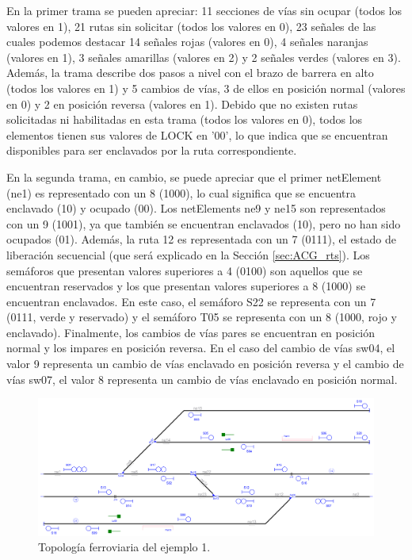 	En la primer trama se pueden apreciar: 11 secciones de vías sin ocupar (todos los valores en 1), 21 rutas sin solicitar (todos los valores en 0), 23 señales de las cuales podemos destacar 14 señales rojas (valores en 0), 4 señales naranjas (valores en 1), 3 señales amarillas (valores en 2) y 2 señales verdes (valores en 3). Además, la trama describe dos pasos a nivel con el brazo de barrera en alto (todos los valores en 1) y 5 cambios de vías, 3 de ellos en posición normal (valores en 0) y 2 en posición reversa (valores en 1). Debido que no existen rutas solicitadas ni habilitadas en esta trama (todos los valores en 0), todos los elementos tienen sus valores de LOCK en '00', lo que indica que se encuentran disponibles para ser enclavados por la ruta correspondiente.

	En la segunda trama, en cambio, se puede apreciar que el primer netElement (ne1) es representado con un 8 (1000), lo cual significa que se encuentra enclavado (10) y ocupado (00). Los netElements ne9 y ne15 son representados con un 9 (1001), ya que también se encuentran enclavados (10), pero no han sido ocupados (01). Además, la ruta 12 es representada con un 7 (0111), el estado de liberación secuencial (que será explicado en la Sección \ref{sec:ACG_rts}). Los semáforos que presentan valores superiores a 4 (0100) son aquellos que se encuentran reservados y los que presentan valores superiores a 8 (1000) se encuentran enclavados. En este caso, el semáforo S22 se representa con un 7 (0111, verde y reservado) y el semáforo T05 se representa con un 8 (1000, rojo y enclavado). Finalmente, los cambios de vías pares se encuentran en posición normal y los impares en posición reversa. En el caso del cambio de vías sw04, el valor 9 representa un cambio de vías enclavado en posición reversa y el cambio de vías sw07, el valor 8 representa un cambio de vías enclavado en posición normal.
	
	\begin{figure}[H]
		\centering
		\includegraphics[width=1\textwidth]{resultados-obtenidos/ejemplo1/images/1_original.png}
		\centering\caption{Topología ferroviaria del ejemplo 1.}
		\label{fig:EJ1_2_B}
	\end{figure}
	
